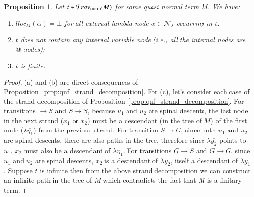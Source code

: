 \documentclass{elsarticle}
\makeatletter
\theoremstyle{plain}
\newtheorem{proposition}[theorem]{Proposition}
\theoremstyle{definition}
\newcommand\Nodes{\mathcal{N}}%
\newcommand\NodesLmd{\Nodes_\lambda}%
\newcommand{\normalizing}{{\sf norm}}
\newcommand{\travsetnorm}{\travset_\normalizing} %
\renewcommand\ie{{\it i.e.\@\xspace}}
\makeatother
\begin{document}
\begin{proposition}
\label{prop:qnf_traversals_are_finite}
Let $t \in \travsetnorm(M)$ for some \emph{quasi normal} term $M$. We have:
\begin{enumerate}[label=(\alph*), nosep]
\item $lloc_M(\alpha) = \bot$ for all external lambda node $\alpha \in \NodesLmd$ occurring in $t$.
\item $t$ does not contain any internal variable node (\ie, all the internal nodes are $@$ nodes);
\item $t$ is finite.
\end{enumerate}
\end{proposition}
\begin{proof}
(a) and (b) are direct consequences of Proposition~\ref{prop:qnf_strand_decomposition}.
For (c), let's consider each case of the strand decomposition of Proposition~\ref{prop:qnf_strand_decomposition}. For transitions $\rightarrow S$ and $S \rightarrow S$, because $u_1$ and $u_2$ are spinal descents, the last node in the next strand ($x_1$ or $x_2$) must be a descendant (in the tree of $M$) of the first node ($\lambda\overline{\eta_1}$) from the previous strand.
For transition $S\rightarrow G$, since both $u_1$ and $u_2$ are spinal descents, there are also paths in the tree, therefore since $\lambda\overline{y_2}$ points to $u_1$, $x_2$ must also be a descendant of $\lambda\overline{\eta_1}$. For transitions $G \rightarrow S$ and $G \rightarrow G$, since $u_1$ and $u_2$ are spinal descents, $x_2$ is a descendant of $\lambda\overline{y_2}$, itself a descendant of $\lambda\overline{y_1}$.
Suppose $t$ is infinite then from the above strand decomposition we can construct an infinite path in the tree of $M$ which contradicts the fact that $M$ is a finitary term.
\end{proof}
\end{document}
